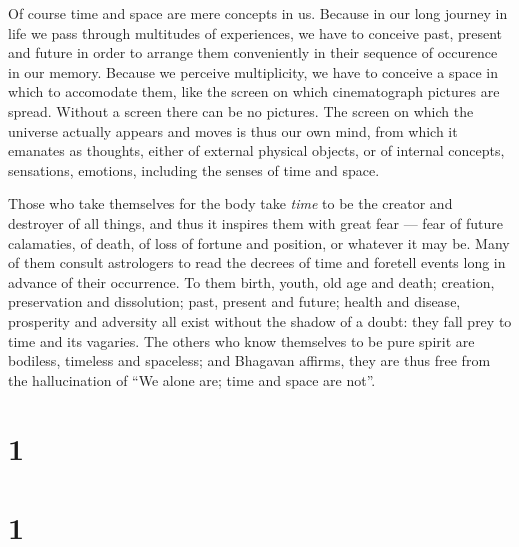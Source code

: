 \documentclass[12pt]{report}
\begin{document}

Of course time and space are mere concepts in us. Because in our long
journey in life we pass through multitudes of experiences, we have to
conceive past, present and future in order to arrange them
conveniently in their sequence of occurence in our memory. Because we
perceive multiplicity, we have to conceive a space in which to
accomodate them, like the screen on which cinematograph pictures are
spread. Without a screen there can be no pictures. The screen on which
the universe actually appears and moves is thus our own mind, from
which it emanates as thoughts, either of external physical objects, or
of internal concepts, sensations, emotions, including the senses of
time and space. 

Those who take themselves for the body take \emph{time} to be the
creator and destroyer of all things, and thus it inspires them with
great fear --- fear of future calamaties, of death, of loss of fortune
and position, or whatever it may be. Many of them consult astrologers
to read the decrees of time and foretell events long in advance of
their occurrence. To them birth, youth, old age and death; creation,
preservation and dissolution; past, present and future; health and
disease, prosperity and adversity all exist without the shadow of a
doubt: they fall prey to time and its vagaries. The others who know
themselves to be pure spirit are bodiless, timeless and spaceless; and
Bhagavan affirms, they are thus free from the hallucination of ``We
alone are; time and space are not''.

\section*{1}

\begin{quote}

\end{quote}


\section*{1}

\begin{quote}

\end{quote}

\end{document}
